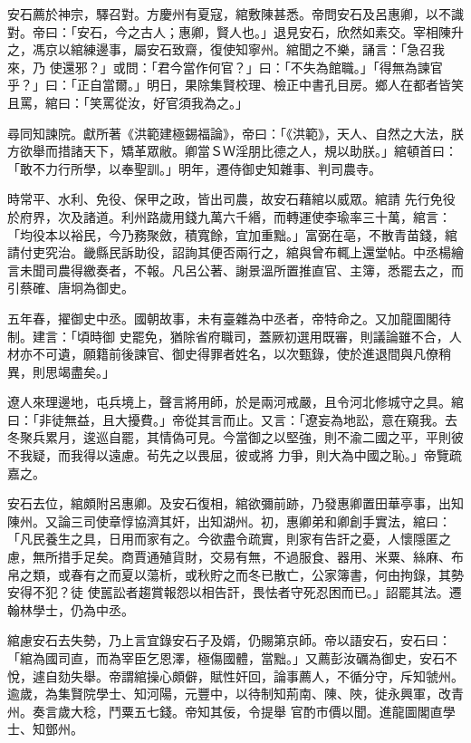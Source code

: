 \begin{pinyinscope}
 安石薦於神宗，驛召對。方慶州有夏寇，綰敷陳甚悉。帝問安石及呂惠卿，以不識對。帝曰：「安石，今之古人；惠卿，賢人也。」退見安石，欣然如素交。宰相陳升之，馮京以綰練邊事，屬安石致齋，復使知寧州。綰聞之不樂，誦言：「急召我來，乃
 使還邪？」或問：「君今當作何官？」曰：「不失為館職。」「得無為諫官乎？」曰：「正自當爾。」明日，果除集賢校理、檢正中書孔目房。鄉人在都者皆笑且罵，綰曰：「笑罵從汝，好官須我為之。」



 尋同知諫院。獻所著《洪範建極錫福論》，帝曰：「《洪範》，天人、自然之大法，朕方欲舉而措諸天下，矯革眾敝。卿當ＳＷ淫朋比德之人，規以助朕。」綰頓首曰：「敢不力行所學，以奉聖訓。」明年，遷侍御史知雜事、判司農寺。



 時常平、水利、免役、保甲之政，皆出司農，故安石藉綰以威眾。綰請
 先行免役於府界，次及諸道。利州路歲用錢九萬六千緡，而轉運使李瑜率三十萬，綰言：「均役本以裕民，今乃務聚斂，積寬餘，宜加重黜。」富弼在亳，不散青苗錢，綰請付吏究治。畿縣民訴助役，詔詢其便否兩行之，綰與曾布輒上還堂帖。中丞楊繪言未聞司農得繳奏者，不報。凡呂公著、謝景溫所置推直官、主簿，悉罷去之，而引蔡確、唐坰為御史。



 五年春，擢御史中丞。國朝故事，未有臺雜為中丞者，帝特命之。又加龍圖閣待制。建言：「頃時御
 史罷免，猶除省府職司，蓋厥初選用既審，則議論雖不合，人材亦不可遺，願籍前後諫官、御史得罪者姓名，以次甄錄，使於進退間與凡僚稍異，則思竭盡矣。」



 遼人來理邊地，屯兵境上，聲言將用師，於是兩河戒嚴，且令河北修城守之具。綰曰：「非徒無益，且大擾費。」帝從其言而止。又言：「遼妄為地訟，意在窺我。去冬聚兵累月，逡巡自罷，其情偽可見。今當御之以堅強，則不渝二國之平，平則彼不我疑，而我得以遠慮。茍先之以畏屈，彼或將
 力爭，則大為中國之恥。」帝覽疏嘉之。



 安石去位，綰頗附呂惠卿。及安石復相，綰欲彌前跡，乃發惠卿置田華亭事，出知陳州。又論三司使章惇協濟其奸，出知湖州。初，惠卿弟和卿創手實法，綰曰：「凡民養生之具，日用而家有之。今欲盡令疏實，則家有告訐之憂，人懷隱匿之慮，無所措手足矣。商賈通殖貨財，交易有無，不過服食、器用、米粟、絲麻、布帛之類，或春有之而夏以蕩析，或秋貯之而冬已散亡，公家簿書，何由拘錄，其勢安得不犯？徒
 使嚚訟者趨賞報怨以相告訐，畏怯者守死忍困而已。」詔罷其法。遷翰林學士，仍為中丞。



 綰慮安石去失勢，乃上言宜錄安石子及婿，仍賜第京師。帝以語安石，安石曰：「綰為國司直，而為宰臣乞恩澤，極傷國體，當黜。」又薦彭汝礪為御史，安石不悅，遽自劾失舉。帝謂綰操心頗僻，賦性奸回，論事薦人，不循分守，斥知虢州。逾歲，為集賢院學士、知河陽，元豐中，以待制知荊南、陳、陜，徙永興軍，改青州。奏言歲大稔，鬥粟五七錢。帝知其佞，令提舉
 官酌市價以聞。進龍圖閣直學士、知鄧州。




\end{pinyinscope}
